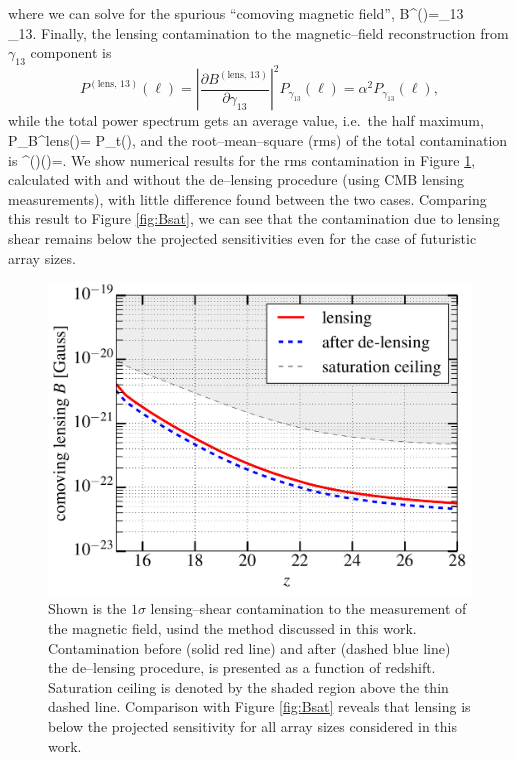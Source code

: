 where we can solve for the spurious ``comoving magnetic field'',
\beq
\bga
B^{()}=\gamma_{13}\nonumber\\
\equiv\alpha\gamma_{13}.
\ega
\eeq
Finally, the lensing contamination to the magnetic--field reconstruction from $\gamma_{13}$ component is
\begin{equation}
P^{(\text{lens, 13})}(\ell)=\left\vert\frac{\partial B^{(\text{lens, 13})}}{\partial\gamma_{13}}\right\vert^2 P_{\gamma_{13}}(\ell)=\alpha^2 P_{\gamma_{13}}(\ell),
\end{equation}
while the total power spectrum gets an average value, i.e.~the half maximum,
\beq
P_B^{\rm lens}(\ell)= P_t(\ell),
\eeq
and the root--mean--square (rms) of the total contamination is
\beq
\Delta^{()}(\ell)=.
\eeq
We show numerical results for the rms contamination in Figure \ref{fig:lensing_B}, calculated with and without the de--lensing procedure (using CMB lensing measurements), with little difference found between the two cases. Comparing this result to Figure \ref{fig:Bsat}, we can see that the contamination due to lensing shear remains below the projected sensitivities even for the case of futuristic array sizes.
\begin{figure}[h]
\centering
\includegraphics[scale=0.4]{delensingB.pdf}
\caption{Shown is the $1\sigma$ lensing--shear contamination to the measurement of the magnetic field, usind the method discussed in this work. Contamination before (solid red line) and after (dashed blue line) the de--lensing procedure, is presented as a function of redshift. Saturation ceiling is denoted by the shaded region above the thin dashed line. Comparison with Figure \ref{fig:Bsat} reveals that lensing is below the projected sensitivity for all array sizes considered in this work.}
\label{fig:lensing_B}
\end{figure}
